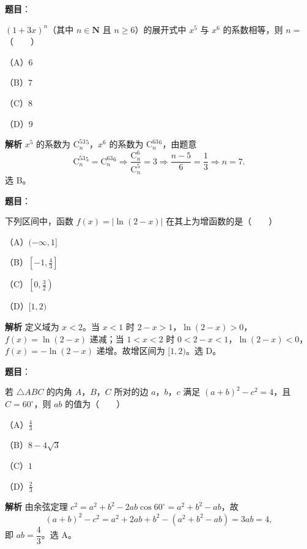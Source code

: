\begin{answer}

\textbf{题目}：

$(1+3x)^n$（其中 $n\in\mathbf N$ 且 $n\geqslant6$）的展开式中 $x^5$ 与 $x^6$ 的系数相等，则 $n=$\mbox{（　　）}

（A）$6$

（B）$7$

（C）$8$

（D）$9$

\textbf{解析}
$x^5$ 的系数为 $\mathrm C_n^53^5$，$x^6$ 的系数为 $\mathrm C_n^63^6$，由题意
\nopagebreak[4]
\[\mathrm C_n^53^5=\mathrm C_n^63^6\Longrightarrow\frac{\mathrm C_n^6}{\mathrm C_n^5}=3\Longrightarrow\frac{n-5}6=\frac13\Longrightarrow n=7.\]
选 B。


\end{answer}
\begin{answer}

\textbf{题目}：

下列区间中，函数 $f(x)=|\ln(2-x)|$ 在其上为增函数的是\mbox{（　　）}

（A）$(-\infty,1]$

（B）$\left[-1,\frac43\right]$

（C）$\left[0,\frac32\right)$

（D）$[1,2)$

\textbf{解析}
定义域为 $x<2$。当 $x<1$ 时 $2-x>1$，$\ln(2-x)>0$，$f(x)=\ln(2-x)$ 递减；当 $1<x<2$ 时 $0<2-x<1$，$\ln(2-x)<0$，$f(x)=-\ln(2-x)$ 递增。故增区间为 $[1,2)$。选 D。


\end{answer}
\begin{answer}

\textbf{题目}：

若 $\triangle ABC$ 的内角 $A$，$B$，$C$ 所对的边 $a$，$b$，$c$ 满足 $(a+b)^2-c^2=4$，且 $C=60^\circ$，则 $ab$ 的值为\mbox{（　　）}

（A）$\frac43$

（B）$8-4\sqrt3$

（C）$1$

（D）$\frac23$

\textbf{解析}
由余弦定理 $c^2=a^2+b^2-2ab\cos60^\circ=a^2+b^2-ab$，故
\nopagebreak[4]
\[(a+b)^2-c^2=a^2+2ab+b^2-(a^2+b^2-ab)=3ab=4,\]
即 $ab=\dfrac43$。选 A。


\end{answer}
